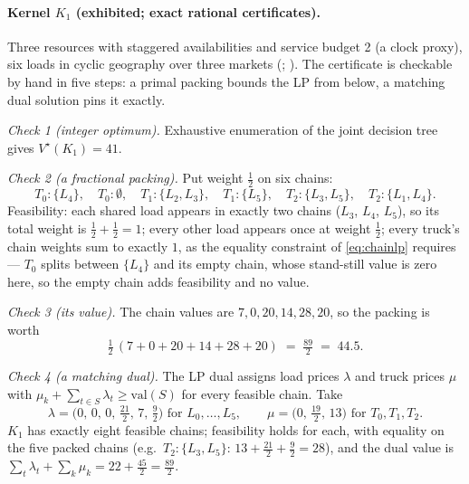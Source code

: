 \documentclass[11pt]{article}
\newcommand{\Vstar}{V^{\star}}
\begin{document}
\paragraph{Kernel $K_1$ (exhibited; exact rational certificates).}
Three resources with staggered availabilities and service budget 2 (a
clock proxy), six loads in cyclic geography over three markets
(; ).
The certificate is checkable by hand in five steps: a primal packing
bounds the LP from below, a matching dual solution pins it exactly.

\emph{Check 1 (integer optimum).} Exhaustive enumeration of the joint
decision tree gives $\Vstar(K_1) = 41$.

\emph{Check 2 (a fractional packing).} Put weight $\tfrac{1}{2}$ on
six chains:
\[
  T_0{:}\{L_4\},\quad T_0{:}\emptyset,\quad
  T_1{:}\{L_2, L_3\},\quad T_1{:}\{L_5\},\quad
  T_2{:}\{L_3, L_5\},\quad T_2{:}\{L_1, L_4\}.
\]
Feasibility: each shared load appears in exactly two chains
($L_3$, $L_4$, $L_5$), so its total weight is
$\tfrac{1}{2} + \tfrac{1}{2} = 1$; every other load appears once at
weight $\tfrac{1}{2}$; every truck's chain weights sum to exactly
$1$, as the equality constraint of \eqref{eq:chainlp} requires ---
$T_0$ splits between $\{L_4\}$ and its empty chain, whose
stand-still value is zero here, so the empty chain adds feasibility
and no value.

\emph{Check 3 (its value).} The chain values are $7, 0, 20, 14, 28,
20$, so the packing is worth
\[
  \tfrac{1}{2}\,(7 + 0 + 20 + 14 + 28 + 20) \;=\; \tfrac{89}{2}
  \;=\; 44.5.
\]

\emph{Check 4 (a matching dual).} The LP dual assigns load prices
$\lambda$ and truck prices $\mu$ with
$\mu_k + \sum_{t \in S} \lambda_t \geq \mathrm{val}(S)$ for every
feasible chain. Take
\[
  \lambda = \bigl(0,\, 0,\, 0,\, \tfrac{21}{2},\, 7,\, \tfrac{9}{2}\bigr)
  \text{ for } L_0, \dots, L_5,
  \qquad
  \mu = \bigl(0,\, \tfrac{19}{2},\, 13\bigr)
  \text{ for } T_0, T_1, T_2.
\]
$K_1$ has exactly eight feasible chains; feasibility holds for each,
with equality on the five packed chains (e.g.\
$T_2{:}\{L_3, L_5\}$: $13 + \tfrac{21}{2} + \tfrac{9}{2} = 28$), and
the dual value is
$\sum_t \lambda_t + \sum_k \mu_k = 22 + \tfrac{45}{2} = \tfrac{89}{2}$.
\end{document}
